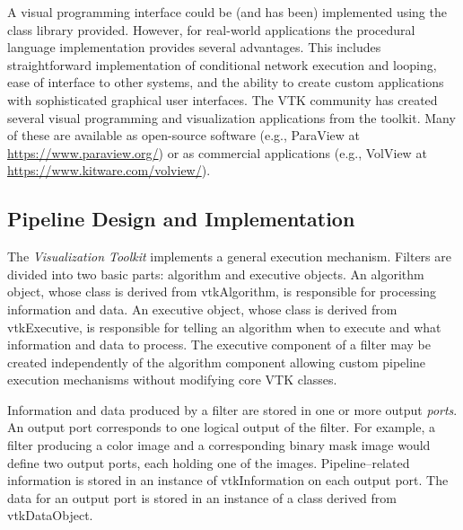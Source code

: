 A visual programming interface could be (and has been) implemented using the class library provided. However, for real-world applications the procedural language implementation provides several advantages. This includes straightforward implementation of conditional network execution and looping, ease of interface to other systems, and the ability to create custom applications with sophisticated graphical user interfaces. The VTK community has created several visual programming and visualization applications from the toolkit. Many of these are available as open-source software (e.g., ParaView at \href{https://www.paraview.org/}{https://www.paraview.org/}) or as commercial applications (e.g., VolView at \href{https://www.kitware.com/volview/}{https://www.kitware.com/volview/}).

\subsection{Pipeline Design and Implementation}
\label{subsec:pipeline_design_implementation}

The \emph{Visualization Toolkit} implements a general execution mechanism. Filters are divided into two basic parts: algorithm and executive objects. An algorithm object, whose class is derived from vtkAlgorithm, is responsible for processing information and data. An executive object, whose class is derived from vtkExecutive, is responsible for telling an algorithm when to execute and what information and data to process. The executive component of a filter may be created independently of the algorithm component allowing custom pipeline execution mechanisms without modifying core VTK classes.

Information and data produced by a filter are stored in one or more output \emph{ports}. An output port corresponds to one logical output of the filter. For example, a filter producing a color image and a corresponding binary mask image would define two output ports, each holding one of the images. Pipeline--related information is stored in an instance of vtkInformation on each output port. The data for an output port is stored in an instance of a class derived from vtkDataObject.

